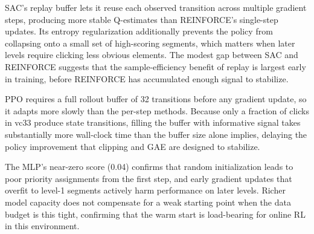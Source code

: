 \documentclass{article}
\begin{document}
SAC's replay buffer lets it reuse each observed transition across multiple gradient steps, producing more stable Q-estimates than REINFORCE's single-step updates. Its entropy regularization additionally prevents the policy from collapsing onto a small set of high-scoring segments, which matters when later levels require clicking less obvious elements. The modest gap between SAC and REINFORCE suggests that the sample-efficiency benefit of replay is largest early in training, before REINFORCE has accumulated enough signal to stabilize.

PPO requires a full rollout buffer of 32 transitions before any gradient update, so it adapts more slowly than the per-step methods. Because only a fraction of clicks in vc33 produce state transitions, filling the buffer with informative signal takes substantially more wall-clock time than the buffer size alone implies, delaying the policy improvement that clipping and GAE are designed to stabilize.

The MLP's near-zero score (0.04) confirms that random initialization leads to poor priority assignments from the first step, and early gradient updates that overfit to level-1 segments actively harm performance on later levels. Richer model capacity does not compensate for a weak starting point when the data budget is this tight, confirming that the warm start is load-bearing for online RL in this environment.



\end{document}
